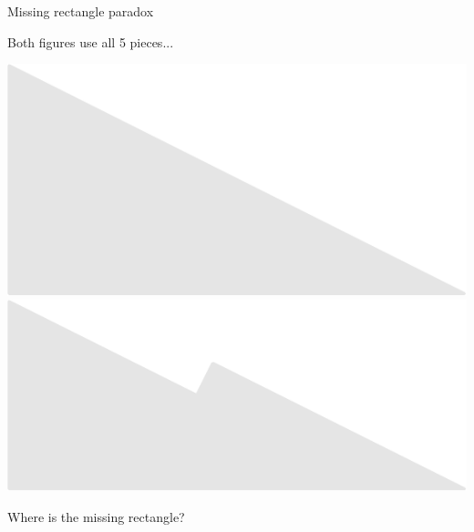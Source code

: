 \documentclass[14pt]{beamer}
\begin{document}

    \begin{frame}{Missing rectangle paradox}
        \begin{center}
            Both figures use all 5 pieces...

            \vspace{44pt}

            \includegraphics[scale=0.45]{figures/figure022l.pdf}\;
            \;\;
            \includegraphics[scale=0.45]{figures/figure026bm.pdf}

            \vspace{32pt}

            Where is the missing rectangle?
        \end{center}
    \end{frame}
\end{document}
